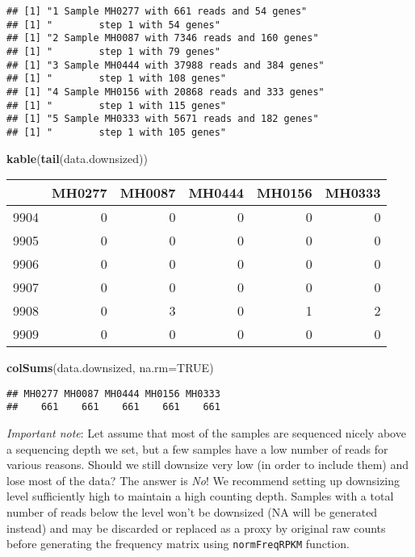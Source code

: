 \documentclass[]{article}
\newenvironment{Shaded}{\begin{snugshade}}{\end{snugshade}}
\newcommand{\KeywordTok}[1]{\textcolor[rgb]{0.13,0.29,0.53}{\textbf{{#1}}}}
\newcommand{\DataTypeTok}[1]{\textcolor[rgb]{0.13,0.29,0.53}{{#1}}}
\newcommand{\OtherTok}[1]{\textcolor[rgb]{0.56,0.35,0.01}{{#1}}}
\newcommand{\NormalTok}[1]{{#1}}
\begin{document}
\begin{verbatim}
## [1] "1 Sample MH0277 with 661 reads and 54 genes"
## [1] "        step 1 with 54 genes"
## [1] "2 Sample MH0087 with 7346 reads and 160 genes"
## [1] "        step 1 with 79 genes"
## [1] "3 Sample MH0444 with 37988 reads and 384 genes"
## [1] "        step 1 with 108 genes"
## [1] "4 Sample MH0156 with 20868 reads and 333 genes"
## [1] "        step 1 with 115 genes"
## [1] "5 Sample MH0333 with 5671 reads and 182 genes"
## [1] "        step 1 with 105 genes"
\end{verbatim}

\begin{Shaded}
\begin{Highlighting}[]
\KeywordTok{kable}\NormalTok{(}\KeywordTok{tail}\NormalTok{(data.downsized))}
\end{Highlighting}
\end{Shaded}

\begin{longtable}[c]{@{}lrrrrr@{}}
\toprule
& MH0277 & MH0087 & MH0444 & MH0156 & MH0333\tabularnewline
\midrule
\endhead
9904 & 0 & 0 & 0 & 0 & 0\tabularnewline
9905 & 0 & 0 & 0 & 0 & 0\tabularnewline
9906 & 0 & 0 & 0 & 0 & 0\tabularnewline
9907 & 0 & 0 & 0 & 0 & 0\tabularnewline
9908 & 0 & 3 & 0 & 1 & 2\tabularnewline
9909 & 0 & 0 & 0 & 0 & 0\tabularnewline
\bottomrule
\end{longtable}

\begin{Shaded}
\begin{Highlighting}[]
\KeywordTok{colSums}\NormalTok{(data.downsized, }\DataTypeTok{na.rm=}\OtherTok{TRUE}\NormalTok{)}
\end{Highlighting}
\end{Shaded}

\begin{verbatim}
## MH0277 MH0087 MH0444 MH0156 MH0333 
##    661    661    661    661    661
\end{verbatim}

\emph{Important note}: Let assume that most of the samples are sequenced
nicely above a sequencing depth we set, but a few samples have a low
number of reads for various reasons. Should we still downsize very low
(in order to include them) and lose most of the data? The answer is
\emph{No}! We recommend setting up downsizing level sufficiently high to
maintain a high counting depth. Samples with a total number of reads
below the level won't be downsized (NA will be generated instead) and
may be discarded or replaced as a proxy by original raw counts before
generating the frequency matrix using \texttt{normFreqRPKM} function.
\end{document}
